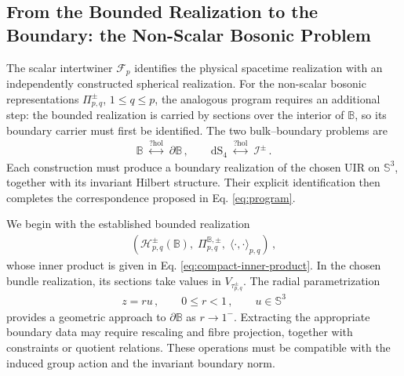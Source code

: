 \documentclass{SciPost}
\begin{document}
\subsection{From the Bounded Realization to the Boundary: the Non-Scalar Bosonic Problem} \label{subsec:nonscalar-compact-boundary}

The scalar intertwiner $\mathcal F_p$ identifies the physical spacetime realization with an independently constructed spherical realization. For the non-scalar bosonic representations $\Pi^\pm_{p,q}$, $1\leqslant q\leqslant p$, the analogous program requires an additional step: the bounded realization is carried by sections over the interior of $\mathbb B$, so its boundary carrier must first be identified. The two bulk--boundary problems are
\begin{align}
    \mathbb B
    \;\overset{?\mathrm{hol}}{\longleftrightarrow}\;
    \partial\mathbb B \,,
    \qquad
    \mathrm{dS}_4
    \;\overset{?\mathrm{hol}}{\longleftrightarrow}\;
    \mathscr I^\pm \,.
\end{align}
Each construction must produce a boundary realization of the chosen UIR on $\mathbb S^3$, together with its invariant Hilbert structure. Their explicit identification then completes the correspondence proposed in Eq. \eqref{eq:program}.

We begin with the established bounded realization
\begin{align}
    \left(
        {\mathcal H}_{p,q}^{\pm}(\mathbb B),\;
        \Pi_{p,q}^{\mathbb B,\pm},\;
        \langle\cdot,\cdot\rangle_{p,q}
    \right) \,,
\end{align}
whose inner product is given in Eq. \eqref{eq:compact-inner-product}. In the chosen bundle realization, its sections take values in $V_{\tau_{p,q}^{\pm}}$. The radial parametrization 
\begin{align}
    z=ru \,,
    \qquad
    0\leqslant r<1 \,,
    \qquad
    u\in\mathbb S^3
\end{align}
provides a geometric approach to $\partial\mathbb B$ as $r\to1^{-}$. Extracting the appropriate boundary data may require rescaling and fibre projection, together with constraints or quotient relations. These operations must be compatible with the induced group action and the invariant boundary norm.
\end{document}
